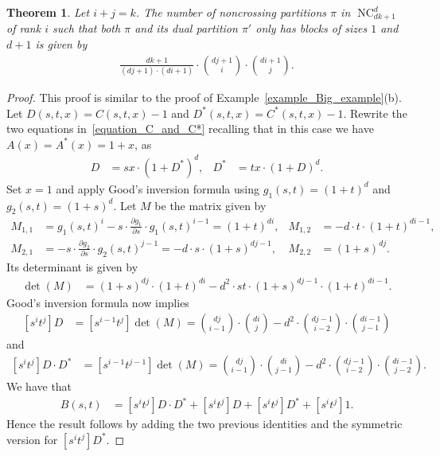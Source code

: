 \documentclass[11pt]{amsart}
\newtheorem{theorem}{Theorem}[section]
\numberwithin{equation}{section}
\newcommand{\binomial}[2]{\binom{#1}{#2}}
\DeclareMathOperator{\NC}{NC}
\begin{document}
\begin{theorem}
Let $i+j=k$.
The number of noncrossing partitions $\pi$ in $\NC^{d}_{dk+1}$ of rank $i$ such that
both $\pi$ and its dual partition $\pi'$
only has blocks of sizes $1$ and $d+1$ is given by
\begin{align*}
\frac{dk+1}{(dj+1) \cdot (di+1)}
\cdot
\binomial{dj+1}{i}
\cdot
\binomial{di+1}{j} .
\end{align*}
\label{theorem_1_d+1}
\end{theorem}
\begin{proof}
This proof is similar to the proof of 
Example~\ref{example_Big_example}(b).
Let $D(s,t,x) = C(s,t,x) - 1$ and $D^{*}(s,t,x) = C^{*}(s,t,x) - 1$.
Rewrite the two equations in~\eqref{equation_C_and_C*}
recalling that in this case we have $A(x) = A^{*}(x) = 1+x$, as
\begin{align*}
D
& =
sx \cdot (1+D^{*})^{d} , &
D^{*}
& =
tx \cdot (1+D)^{d} .
\end{align*}
Set $x=1$ and apply Good's inversion formula using
$g_{1}(s,t) = (1+t)^{d}$
and
$g_{2}(s,t) = (1+s)^{d}$.
Let $M$ be the matrix given by
\begin{align*}
M_{1,1}
& =
g_{1}(s,t)^{i} - s \cdot \frac{\partial g_{1}}{\partial s} \cdot g_{1}(s,t)^{i-1}
= 
(1+t)^{di} , 
&
M_{1,2}
& =
- d \cdot t \cdot (1+t)^{di-1} , \\
M_{2,1}
& =
- s \cdot \frac{\partial g_{2}}{\partial s} \cdot g_{2}(s,t)^{j-1}
=
- d \cdot s \cdot (1+s)^{dj-1} , 
&
M_{2,2}
& =
(1+s)^{dj} .
\end{align*}
Its determinant is given by
\begin{align*}
\det(M)
& =
(1+s)^{dj} \cdot (1+t)^{di}
-
 d^{2} \cdot st
\cdot
(1+s)^{dj-1} \cdot (1+t)^{di-1}  .
\end{align*}
Good's inversion formula now implies
\begin{align}
\nonumber
[s^{i} t^{j}] D
& =
[s^{i-1} t^{j}] \det(M) 
=
\binomial{dj}{i-1} \cdot \binomial{di}{j}
-
d^{2} \cdot \binomial{dj-1}{i-2} \cdot \binomial{di-1}{j-1} 
\nonumber
\end{align}
and
\begin{align}
\nonumber
[s^{i} t^{j}] D \cdot D^{*}
& =
[s^{i-1} t^{j-1}] \det(M)
=
\binomial{dj}{i-1} \cdot \binomial{di}{j-1}
-
d^{2} \cdot \binomial{dj-1}{i-2} \cdot \binomial{di-1}{j-2} .
\nonumber
\end{align}
We have that
\begin{align*}
[s^{i} t^{j}] B(s,t)
& =
[s^{i} t^{j}] D \cdot D^{*}
+
[s^{i} t^{j}] D
+
[s^{i} t^{j}] D^{*}
+
[s^{i} t^{j}] 1.
\end{align*}
Hence the result follows by adding the two previous identities and
the symmetric version for $[s^{i} t^{j}] D^{*}$.
\end{proof}
\end{document}
